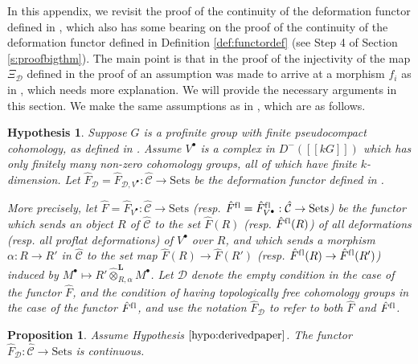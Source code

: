 \documentclass{amsart}
\theoremstyle{plain}
\newtheorem{hypo}{Hypothesis}
\newtheorem{secprop}[secthm]{Proposition}
\theoremstyle{definition}
\theoremstyle{remark}
\begin{document}
In this appendix, we revisit the proof of the continuity of the deformation functor defined in 
\cite{bcderived},
which also has some bearing on the proof of the continuity of the deformation functor defined in 
Definition \ref{def:functordef} (see Step 4 of Section \ref{s:proofbigthm}).
The main point is that in the proof of the injectivity of the map $\Xi_{\mathcal{D}}$ defined in
the proof of \cite[Prop. 7.2]{bcderived} an assumption was made to arrive at a morphism 
$f_i$ as in \cite[Eq. (7.5)]{bcderived}, which needs more explanation. We will provide the necessary 
arguments in this section. We make the same assumptions as in \cite{bcderived}, which are as follows.

\begin{hypo}
\label{hypo:derivedpaper}
Suppose $G$ is a profinite group with finite pseudocompact cohomology, as defined in \cite[Def. 2.13]{bcderived}. Assume $V^\bullet $ is a
complex in $D^-([[kG]])$ which has  only finitely many non-zero cohomology
groups, all of which have finite $k$-dimension. 
Let $\hat{F}_{\mathcal{D}}=\hat{F}_{\mathcal{D},V^\bullet}:\hat{\mathcal{C}} \to 
\mathrm{Sets}$ be the deformation functor defined in \cite[Def. 2.10]{bcderived}.

More precisely, let $\hat{F} = \hat{F}_{V^\bullet}:\hat{\mathcal{C}} \to \mathrm{Sets}$
(resp. $\hat{F}^{\mathrm{f\/l}} = \hat{F}^{\mathrm{f\/l}}_{V^\bullet}:\hat{\mathcal{C}} \to \mathrm{Sets}$)
be the functor which sends an object $R$ of $\hat{\mathcal{C}}$ to the set
$\hat{F}(R)$ (resp. $\hat{F}^{\mathrm{f\/l}}(R)$) of all deformations (resp. all proflat deformations)
of $V^\bullet$ over $R$, and which sends
a morphism $\alpha:R\to R'$ in $\hat{\mathcal{C}}$ to the set map
$\hat{F}(R)\to \hat{F}(R')$ (resp. $\hat{F}^{\mathrm{f\/l}}(R)\to \hat{F}^{\mathrm{f\/l}}(R')$)
induced by $M^\bullet \mapsto R'\hat{\otimes}_{R,\alpha}^{\mathbf{L}}
M^\bullet$. Let  $\mathcal{D}$  denote the empty
condition in the case of the functor $\hat{F}$, and the condition of having
topologically free cohomology groups
in the case of the functor $\hat{F}^{\mathrm{f\/l}}$, and use the notation $\hat{F}_{\mathcal{D}}$
to refer to both $\hat{F}$ and $\hat{F}^{\mathrm{f\/l}}$.
\end{hypo}

\begin{secprop}
\label{prop:continuityagain}
Assume Hypothesis $\ref{hypo:derivedpaper}$. The functor $\hat{F}_{\mathcal{D}}:\hat{\mathcal{C}} \to 
\mathrm{Sets}$ is continuous.
\end{secprop}
\end{document}
